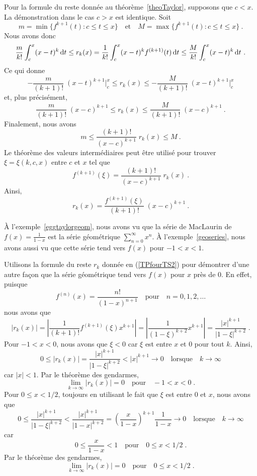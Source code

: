 {\begin{rmk}[\theory]
Pour la formule du reste donnée au théorème~\ref{theoTaylor},
supposons que $c<x$.  La démonstration dans le cas $c>x$ est
identique.  Soit
\[
m = \min \{ f^{k+1}(t) : c \leq t \leq x \} \quad \text{et} \quad
M = \max \{ f^{k+1}(t) : c \leq t \leq x \} \ .
\]
Nous avons donc
\[
\frac{m}{k!} \int_c^x (x-t)^k \,\mathrm{d}t \leq
r_k(x) = \frac{1}{k!} \int_c^x (x-t)^k f^{(k+1)}(t) \,\mathrm{d}t \leq
\frac{M}{k!} \int_c^x (x-t)^k \,\mathrm{d}t \ .
\]
Ce qui donne
\[
-\frac{m}{(k+1)!}\; (x-t)^{k+1}\bigg|_c^x \leq r_k(x) \leq
-\frac{M}{(k+1)!}\; (x-t)^{k+1}\bigg|_c^x
\]
et, plus précisément,
\[
\frac{m}{(k+1)!}\; (x-c)^{k+1} \leq r_k(x) \leq
\frac{M}{(k+1)!}\; (x-c)^{k+1} \ .
\]
Finalement, nous avons
\[
m \leq \frac{(k+1)!}{(x-c)^{k+1}}\; r_k(x) \leq M \ .
\]
Le théorème des valeurs intermédiaires peut être utilisé pour trouver
$\xi = \xi(k,c,x)$ entre $c$ et $x$ tel que
\[
f^{(k+1)}(\xi) = \frac{(k+1)!}{(x-c)^{k+1}}\; r_k(x) \ .
\]
Ainsi,
\[
r_k(x) = \frac{f^{(k+1)}(\xi)}{(k+1)!}\; (x-c)^{k+1}  \ .
\]
\end{rmk}

\begin{egg}
À l'exemple~\ref{eggtaylorgeom}, nous avons vu que la série de MacLaurin de
$\displaystyle f(x) = \frac{1}{1-x}$ est la série géométrique
$\displaystyle \sum_{n=0}^\infty x^n$.  À l'exemple~\ref{geoseries}, 
nous avons aussi vu que cette série tend vers $f(x)$ pour $-1< x < 1$.

Utilisons la formule du reste $r_k$ donnée en (\ref{TPfourTS2}) pour
démontrer d'une autre façon que la série géométrique tend vers $f(x)$
pour $x$ près de $0$.  En effet, puisque
\[
f^{(n)}(x) = \frac{n!}{(1-x)^{n+1}} \quad \text{pour} \quad n=0, 1, 2, \ldots
\]
nous avons que
\[
|r_k(x)| =
\left| \frac{1}{(k+1)!} f^{(k+1)}(\xi) x^{k+1} \right|
= \left| \frac{1}{(1-\xi)^{k+2}} x^{k+1} \right|
= \frac{|x|^{k+1}}{|1-\xi|^{k+2}}  \; .
\]
Pour $-1<x<0$, nous avons que $\xi <0$ car $\xi$ est entre $x$ et $0$
pour tout $k$.  Ainsi,
\[
0 \leq |r_k(x)|
= \frac{|x|^{k+1}}{|1-\xi|^{k+2}} < |x|^{k+1} \rightarrow 0
\quad \text{lorsque} \quad k \rightarrow \infty
\]
car $|x|<1$.  Par le théorème des gendarmes,
\[
\lim_{k\rightarrow \infty} |r_k(x)| = 0 \quad \text{pour} \quad -1<x<0 \; .
\]
Pour $0\leq x <1/2$, toujours en utilisant le fait que $\xi$ est entre
$0$ et $x$, nous avons que
\[
0 \leq \frac{|x|^{k+1}}{|1-\xi|^{k+2}} < \frac{|x|^{k+1}}{|1-x|^{k+2}}
= \left(\frac{x}{1-x}\right)^{k+1} \frac{1}{1-x} \rightarrow 0
\quad \text{lorsque} \quad k \rightarrow \infty
\]
car
\[
0 \leq \frac{x}{1-x} < 1 \quad \text{pour} \quad 0\leq x <1/2 \; .
\]
Par le théorème des gendarmes,
\[
\lim_{k\rightarrow \infty} |r_k(x)| = 0 \quad \text{pour} \quad 0\leq x< 1/2 \; .
\]


\end{egg}}
